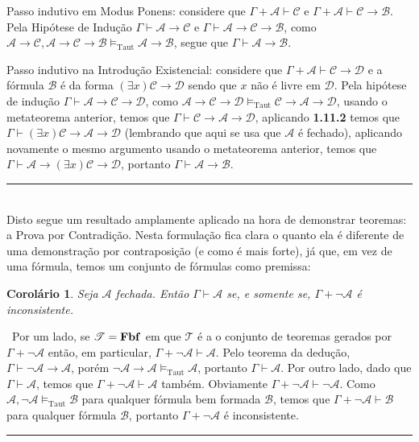 \documentclass[11pt,a4paper]{article}
\newtheorem{cor}[mydef]{Corolário}
\def\dem{\par\smallbreak\noindent {\textit{ Demonstração:}} \ }
\def\eop{\hfill\rule{2.5mm}{2.5mm} \\ }
\theoremstyle{definition}
\begin{document}
Passo indutivo em Modus Ponens: considere que $\Gamma + \mathscr{A} \vdash \mathscr{C}$ e $\Gamma + \mathscr{A} \vdash \mathscr{C}\rightarrow \mathscr{B}$. Pela Hipótese de Indução $\Gamma \vdash \mathscr{A} \rightarrow \mathscr{C}$ e $\Gamma \vdash \mathscr{A} \rightarrow \mathscr{C} \rightarrow \mathscr{B}$, como $\mathscr{A} \rightarrow \mathscr{C},  \mathscr{A} \rightarrow \mathscr{C} \rightarrow \mathscr{B}\vDash_{\textrm{Taut}} \mathscr{A} \rightarrow \mathscr{B}$, segue que $\Gamma \vdash \mathscr{A} \rightarrow \mathscr{B}$.

Passo indutivo na Introdução Existencial: considere que $\Gamma + \mathscr{A} \vdash \mathscr{C}\rightarrow \mathscr{D}$ e a fórmula $\mathscr{B}$ é da forma $(\exists x)\mathscr{C}\rightarrow \mathscr{D}$ sendo que $x$ não é livre em $\mathscr{D}$. Pela hipótese de indução $\Gamma \vdash \mathscr{A} \rightarrow \mathscr{C} \rightarrow \mathscr{D}$, como $ \mathscr{A} \rightarrow \mathscr{C} \rightarrow \mathscr{D}\vDash_{\textrm{Taut}}  \mathscr{C} \rightarrow \mathscr{A} \rightarrow \mathscr{D}$, usando o metateorema anterior, temos que $\Gamma \vdash \mathscr{C} \rightarrow \mathscr{A} \rightarrow \mathscr{D}$, aplicando \textbf{1.11.2} temos que  $\Gamma \vdash (\exists x)\mathscr{C} \rightarrow \mathscr{A} \rightarrow \mathscr{D}$ (lembrando que aqui se usa que $\mathscr{A}$ é fechado), aplicando novamente o mesmo argumento usando o metateorema anterior, temos que $\Gamma \vdash \mathscr{A} \rightarrow (\exists x)\mathscr{C} \rightarrow \mathscr{D}$, portanto $\Gamma \vdash \mathscr{A} \rightarrow \mathscr{B}$. \eop 

Disto segue um resultado amplamente aplicado na hora de demonstrar teoremas: a Prova por Contradição. Nesta formulação fica clara o quanto ela é diferente de uma demonstração por contraposição (e como é mais forte), já que, em vez de uma fórmula, temos um conjunto de fórmulas como premissa: 

\begin{cor}
	
	Seja $ \mathscr{A}$ fechada. Então $\Gamma \vdash \mathscr{A}$ se, e somente se, $\Gamma + \neg \mathscr{A}$ é inconsistente. 
	
\end{cor}   

\dem Por um lado, se $\mathscr{T}=\textrm{\textbf{Fbf}}$ em que  $\mathscr{T}$ é a o conjunto de teoremas gerados por $\Gamma + \neg \mathscr{A}$ então, em particular, $\Gamma + \neg \mathscr{A}\vdash \mathscr{A} $. Pelo teorema da dedução, $\Gamma \vdash  \neg \mathscr{A} \rightarrow \mathscr{A}$, porém $\neg \mathscr{A} \rightarrow \mathscr{A} \vDash_{\textrm{Taut}} \mathscr{A}$, portanto $\Gamma \vdash \mathscr{A} $. Por outro lado, dado que  $\Gamma \vdash \mathscr{A}$, temos que  $\Gamma + \neg  \mathscr{A} \vdash \mathscr{A}$ também. Obviamente $\Gamma + \neg  \mathscr{A} \vdash \neg \mathscr{A}$. Como $\mathscr{A}, \neg \mathscr{A}\vDash_{\textrm{Taut}} \mathscr{B} $ para qualquer fórmula bem formada $\mathscr{B}$, temos que $\Gamma + \neg \mathscr{A} \vdash \mathscr{B}$ para qualquer fórmula $\mathscr{B}$, portanto $\Gamma + \neg \mathscr{A}$ é inconsistente. \eop
\end{document}
